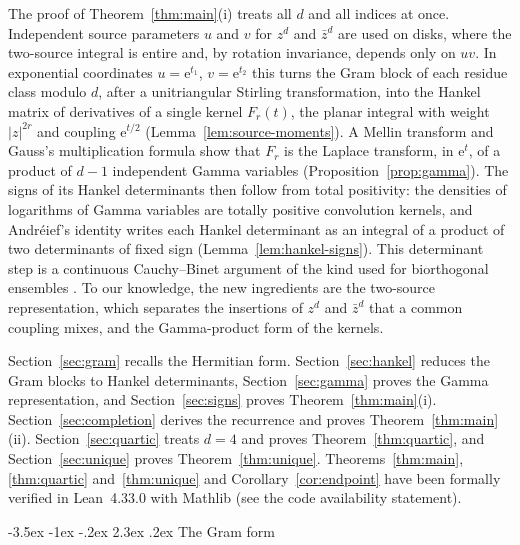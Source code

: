 \documentclass[twoside,10pt]{article}
\makeatletter
\numberwithin{equation}{section}
\theoremstyle{slbody}
\theoremstyle{remark}
\newcommand{\e}{\mathrm e}
\renewcommand{\section}{%
  \@startsection{section}{1}{\z@}%
    {-3.5ex \@plus -1ex \@minus -.2ex}%
    {2.3ex \@plus .2ex}%
    {\normalfont\large\bfseries}}
\makeatother
\begin{document}
The proof of Theorem~\ref{thm:main}(i) treats all \(d\) and all indices
at once.  Independent source parameters \(u\) and \(v\) for \(z^d\) and
\(\bar z^d\) are used on disks, where the two-source integral is entire
and, by rotation invariance, depends only on \(uv\).  In exponential
coordinates \(u=\e^{t_1}\), \(v=\e^{t_2}\) this turns the Gram block of
each residue class modulo \(d\), after a unitriangular Stirling
transformation, into the Hankel matrix of derivatives of a single
kernel \(F_r(t)\), the planar integral with weight \(|z|^{2r}\) and
coupling \(\e^{t/2}\) (Lemma~\ref{lem:source-moments}).  A Mellin
transform and Gauss's multiplication formula show that \(F_r\) is the
Laplace transform, in \(\e^t\), of a product of \(d-1\) independent
Gamma variables (Proposition~\ref{prop:gamma}).  The signs of its Hankel
determinants then follow from total positivity: the densities of
logarithms of Gamma variables are totally positive convolution kernels,
and Andr\'eief's identity writes each Hankel determinant as an integral
of a product of two determinants of fixed sign
(Lemma~\ref{lem:hankel-signs}).  This determinant step is a continuous
Cauchy--Binet argument of the kind used for biorthogonal ensembles
\cite{Borodin1998}.  To our knowledge, the new ingredients are the
two-source representation, which separates the insertions of \(z^d\)
and \(\bar z^d\) that a common coupling mixes, and the Gamma-product
form of the kernels.

Section~\ref{sec:gram} recalls the Hermitian form.
Section~\ref{sec:hankel} reduces the Gram blocks to Hankel determinants,
Section~\ref{sec:gamma} proves the Gamma representation, and
Section~\ref{sec:signs} proves Theorem~\ref{thm:main}(i).
Section~\ref{sec:completion} derives the recurrence and proves
Theorem~\ref{thm:main}(ii).  Section~\ref{sec:quartic} treats \(d=4\)
and proves Theorem~\ref{thm:quartic}, and Section~\ref{sec:unique}
proves Theorem~\ref{thm:unique}.  Theorems~\ref{thm:main},
\ref{thm:quartic} and~\ref{thm:unique} and
Corollary~\ref{cor:endpoint} have been formally verified in Lean~4.33.0
with Mathlib (see the code availability statement).

\section{The Gram form}\label{sec:gram}
\end{document}
